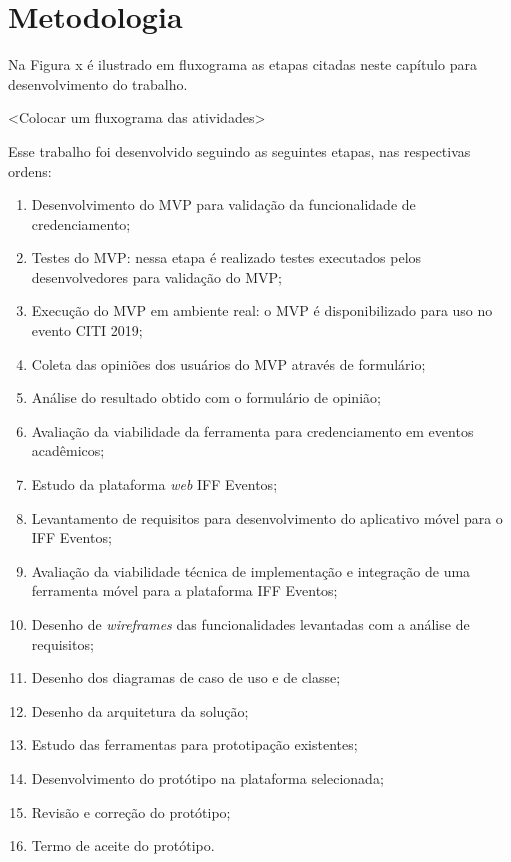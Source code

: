 \chapter{Metodologia}

Na Figura x é ilustrado em fluxograma as etapas citadas neste capítulo para desenvolvimento do trabalho.

<Colocar um fluxograma das atividades>

Esse trabalho foi desenvolvido seguindo as seguintes etapas, nas respectivas ordens: 

\begin{enumerate}
  \item Desenvolvimento do MVP para validação da funcionalidade de credenciamento;
  \item Testes do MVP: nessa etapa é realizado testes executados pelos desenvolvedores para validação do MVP;
  \item Execução do MVP em ambiente real: o MVP é disponibilizado para uso no evento CITI 2019;
  \item Coleta das opiniões dos usuários do MVP através de formulário;
  \item Análise do resultado obtido com o formulário de opinião;
  \item Avaliação da viabilidade da ferramenta para credenciamento em eventos acadêmicos;
  \item Estudo da plataforma \textit{web} IFF Eventos;
  \item Levantamento de requisitos para desenvolvimento do aplicativo móvel para o IFF Eventos;
  \item Avaliação da viabilidade técnica de implementação e integração de uma ferramenta móvel para a plataforma IFF Eventos;
  \item Desenho de \textit{wireframes} das funcionalidades levantadas com a análise de requisitos;
  \item Desenho dos diagramas de caso de uso e de classe;
  \item Desenho da arquitetura da solução;
  \item Estudo das ferramentas para prototipação existentes;
  \item Desenvolvimento do protótipo na plataforma selecionada;
  \item Revisão e correção do protótipo;
  \item Termo de aceite do protótipo.
\end{enumerate}